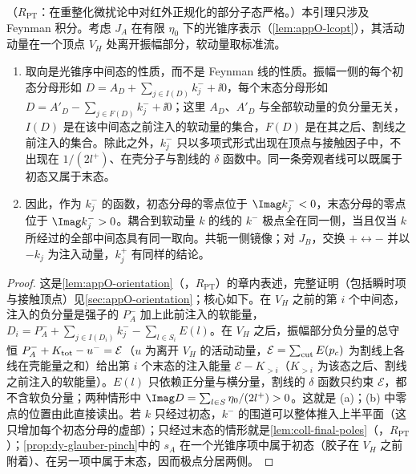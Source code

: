 \begin{lemma}\label{lem:dy-poles-orientation}
（$R_{\mathrm{PT}}$：在重整化微扰论中对红外正规化的部分子态严格。）本引理只涉及 Feynman 积分。考虑 $J_A$ 在有限 $\eta_0$ 下的光锥序表示（\cref{lem:appO-lcopt}），其活动动量在一个顶点 $V_H$ 处离开振幅部分，软动量取标准流。
\begin{enumerate}[label=(\alph*),leftmargin=2.2em,itemsep=1pt,topsep=2pt]
\item 取向是光锥序中间态的性质，而不是 Feynman 线的性质。振幅一侧的每个初态分母形如 $D=A_D+\sum_{j\in I(D)}k_j^-+\ii0$，每个末态分母形如 $D=A'_D-\sum_{j\in F(D)}k_j^-+\ii0$；这里 $A_D$、$A'_D$ 与全部软动量的负分量无关，$I(D)$ 是在该中间态之前注入的软动量的集合，$F(D)$ 是在其之后、割线之前注入的集合。除此之外，$k_j^-$ 只以多项式形式出现在顶点与接触因子中，不出现在 $1/(2l^+)$、在壳分子与割线的 $\delta$ 函数中。同一条旁观者线可以既属于初态又属于末态。
\item 因此，作为 $k_j^-$ 的函数，初态分母的零点位于 $\Imag k_j^-<0$，末态分母的零点位于 $\Imag k_j^->0$。耦合到软动量 $k$ 的线的 $k^-$ 极点全在同一侧，当且仅当 $k$ 所经过的全部中间态具有同一取向。共轭一侧镜像；对 $J_B$，交换 $+\leftrightarrow-$ 并以 $-k_j$ 为注入动量，$k_j^+$ 有同样的结论。
\end{enumerate}
\end{lemma}

\begin{proof}
这是\cref{lem:appO-orientation}（\tagR，$R_{\mathrm{PT}}$）的章内表述，完整证明（包括瞬时项与接触顶点）见\cref{sec:appO-orientation}；核心如下。在 $V_H$ 之前的第 $i$ 个中间态，注入的负分量是强子的 $P_A^-$ 加上此前注入的软能量，$D_i=P_A^-+\sum_{j\in I(D_i)}k_j^--\sum_{l\in S_i}E(l)$。在 $V_H$ 之后，振幅部分负分量的总守恒 $P_A^-+K_{\rm tot}-u^-=\mathcal E$（$u$ 为离开 $V_H$ 的活动动量，$\mathcal E=\sum_{\rm cut}E(p_c)$ 为割线上各线在壳能量之和）给出第 $i$ 个末态的注入能量 $\mathcal E-K_{>i}$（$K_{>i}$ 为该态之后、割线之前注入的软能量）。$E(l)$ 只依赖正分量与横分量，割线的 $\delta$ 函数只约束 $\mathcal E$，都不含软负分量；两种情形中 $\Imag D=\sum_{l\in S}\eta_0/(2l^+)>0$。这就是 (a)；(b) 中零点的位置由此直接读出。若 $k$ 只经过初态，$k^-$ 的围道可以整体推入上半平面（这只增加每个初态分母的虚部）；只经过末态的情形就是\cref{lem:coll-final-poles}（\tagR，$R_{\mathrm{PT}}$）；\cref{prop:dy-glauber-pinch}中的 $s_A$ 在一个光锥序项中属于初态（胶子在 $V_H$ 之前附着）、在另一项中属于末态，因而极点分居两侧。
\end{proof}

